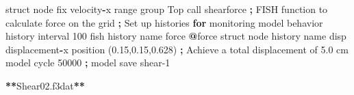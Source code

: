 \documentclass[a4paper, nobind]{templates/ociamthesis}
\newenvironment{Shaded}{\begin{snugshade}}{\end{snugshade}}
\newcommand{\BuiltInTok}[1]{#1}
\newcommand{\ControlFlowTok}[1]{\textcolor[rgb]{0.13,0.29,0.53}{\textbf{#1}}}
\newcommand{\DecValTok}[1]{\textcolor[rgb]{0.00,0.00,0.81}{#1}}
\newcommand{\FloatTok}[1]{\textcolor[rgb]{0.00,0.00,0.81}{#1}}
\newcommand{\NormalTok}[1]{#1}
\newcommand{\OperatorTok}[1]{\textcolor[rgb]{0.81,0.36,0.00}{\textbf{#1}}}
\newcommand{\StringTok}[1]{\textcolor[rgb]{0.31,0.60,0.02}{#1}}
\renewenvironment{Shaded}
{
  \vspace{10pt}%
  \begin{snugshade}%
}{%
  \end{snugshade}%
  \vspace{8pt}%
}
\begin{document}
\begin{Shaded}
\begin{Highlighting}[]
\NormalTok{    struct node fix velocity}\OperatorTok{{-}}\NormalTok{x }\BuiltInTok{range}\NormalTok{ group }\StringTok{\textquotesingle{}Top\textquotesingle{}}
\NormalTok{    call }\StringTok{\textquotesingle{}shearforce\textquotesingle{}} \OperatorTok{;}\NormalTok{ FISH function to calculate force on the grid}
    \OperatorTok{;}\NormalTok{ Set up histories }\ControlFlowTok{for}\NormalTok{ monitoring model behavior}
\NormalTok{    history interval }\DecValTok{100}
\NormalTok{    fish history name }\StringTok{\textquotesingle{}force\textquotesingle{}} \OperatorTok{@}\NormalTok{force}
\NormalTok{    struct node history name }\StringTok{\textquotesingle{}disp\textquotesingle{}}\NormalTok{ displacement}\OperatorTok{{-}}\NormalTok{x position (}\FloatTok{0.15}\NormalTok{,}\FloatTok{0.15}\NormalTok{,}\FloatTok{0.628}\NormalTok{)}
    \OperatorTok{;}\NormalTok{ Achieve a total displacement of }\FloatTok{5.0}\NormalTok{ cm}
\NormalTok{    model cycle }\DecValTok{50000}
    \OperatorTok{;}
\NormalTok{    model save }\StringTok{\textquotesingle{}shear{-}1\textquotesingle{}}

\OperatorTok{**}\NormalTok{Shear02.f3dat}\OperatorTok{**}


\end{Highlighting}
\end{Shaded}
\end{document}

